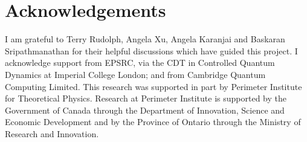 \documentclass{amsart}
\theoremstyle{definition}
\begin{document}
\section{Acknowledgements}
I am grateful to Terry Rudolph, Angela Xu, Angela Karanjai and Baskaran Sripathmanathan for their helpful discussions which have guided this project. I acknowledge support from EPSRC, via the CDT in Controlled Quantum Dynamics at Imperial College London; and from Cambridge Quantum Computing Limited. This research was supported in part by Perimeter Institute for Theoretical Physics. Research at Perimeter Institute is supported by the Government of Canada through the Department of Innovation, Science and Economic Development and by the Province of Ontario through the Ministry of Research and Innovation.

{}

\end{document}
